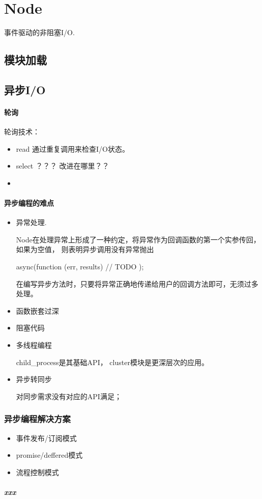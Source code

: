 \chapter{Node}

事件驱动的非阻塞I/O.

\section{模块加载}

\section{异步I/O}


\subsubsection{轮询}

轮询技术：
\begin{itemize}
\item read 通过重复调用来检查I/O状态。

\item select ？？？ 改进在哪里？？

\item 
\end{itemize}


\subsubsection{异步编程的难点}

\begin{itemize}
\item 异常处理.

Node在处理异常上形成了一种约定，将异常作为回调函数的第一个实参传回，如果为空值，
则表明异步调用没有异常抛出

\begin{JavaScript}
async(function (err, results) {
// TODO
});
\end{JavaScript}

在编写异步方法时，只要将异常正确地传递给用户的回调方法即可，无须过多处理。


\item 函数嵌套过深

\item 阻塞代码

\item 多线程编程

child_process是其基础API， cluster模块是更深层次的应用。

\item 异步转同步

对同步需求没有对应的API满足；
\end{itemize}


\subsection{异步编程解决方案}

\begin{itemize}
\item 事件发布/订阅模式
\item promise/deffered模式
\item 流程控制模式
\end{itemize}

\paragraph{xxx}
